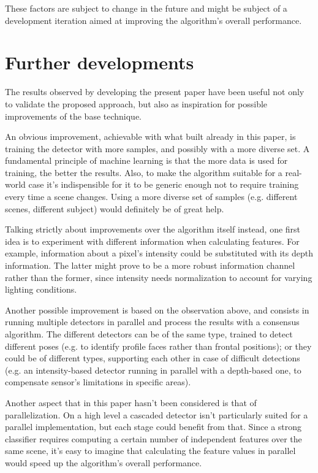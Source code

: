 \documentclass[a4paper,11pt,titlepage]{article}
\begin{document}
These factors are subject to change in the future and might be subject of a
development iteration aimed at improving the algorithm's overall performance.

\section{Further developments}
The results observed by developing the present paper have been useful not only to
validate the proposed approach, but also as inspiration for possible
improvements of the base technique.

An obvious improvement, achievable with what built already in this paper, is
training the detector with more samples, and possibly with a more diverse set. A
fundamental principle of machine learning is that the more data is used for
training, the better the results. Also, to make the algorithm suitable for a
real-world case it's indispensible for it to be generic enough not to require
training every time a scene changes. Using a more diverse set of samples (e.g.
different scenes, different subject) would definitely be of great help.

Talking strictly about improvements over the algorithm itself instead, one first
idea is to experiment with different information when calculating features. For
example, information about a pixel's intensity could be substituted with its
depth information. The latter might prove to be a more robust information
channel rather than the former, since intensity needs normalization to account
for varying lighting conditions.

Another possible improvement is based on the observation above, and consists in
running multiple detectors in parallel and process the results with a consensus
algorithm. The different detectors can be of the same type, trained to detect
different poses (e.g. to identify profile faces rather than frontal positions);
or they could be of different types, supporting each other in case of difficult
detections (e.g. an intensity-based detector running in parallel with a
depth-based one, to compensate sensor's limitations in specific areas).

Another aspect that in this paper hasn't been considered is that of
parallelization. On a high level a cascaded detector isn't particularly suited
for a parallel implementation, but each stage could benefit from that. Since a
strong classifier requires computing a certain number of independent features
over the same scene, it's easy to imagine that calculating the feature values in
parallel would speed up the algorithm's overall performance.
\end{document}
